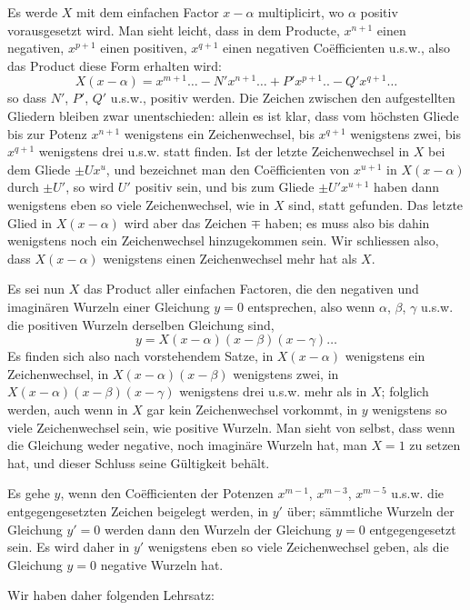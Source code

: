 \documentclass[14pt]{memoir}
\theoremstyle{plain}
\theoremstyle{remark}
\begin{document}
Es werde \(X\) mit dem einfachen Factor \(x-\alpha\) multiplicirt, wo \(\alpha\) positiv vorausgesetzt wird. Man sieht leicht, dass in dem Producte, \(x^{n+1}\) einen negativen, \(x^{p+1}\) einen positiven, \(x^{q+1}\) einen negativen Coëfficienten u.s.w., also das Product diese Form erhalten wird:
\[X(x-\alpha) = x^{m+1}\dots-N'x^{n+1}\dots+P'x^{p+1}..-Q'x^{q+1}\dots\]
so dass \(N'\), \(P'\), \(Q'\) u.s.w., positiv werden. Die Zeichen zwischen den aufgestellten Gliedern bleiben zwar unentschieden: allein es ist klar, dass vom höchsten Gliede bis zur Potenz \(x^{n+1}\) wenigstens ein Zeichenwechsel, bis \(x^{q+1}\) wenigstens zwei, bis \(x^{q+1}\) wenigstens drei u.s.w. statt finden. Ist der letzte Zeichenwechsel in \(X\) bei dem Gliede \(\pm Ux^u\), und bezeichnet man den Coëfficienten von \(x^{u+1}\) in \(X(x-\alpha)\) durch \(\pm U'\), so wird \(U'\) positiv sein, und bis zum Gliede \(\pm U'x^{u+1}\) haben dann wenigstens eben so viele Zeichenwechsel, wie in \(X\) sind, statt gefunden. Das letzte Glied in \(X(x-\alpha)\) wird aber das Zeichen \(\mp\) haben; es muss also bis dahin wenigstens noch ein Zeichenwechsel hinzugekommen sein. Wir schliessen also, dass \(X(x-\alpha)\) wenigstens einen Zeichenwechsel mehr hat als \(X\).

Es sei nun \(X\) das Product aller einfachen Factoren, die den negativen und imaginären Wurzeln einer Gleichung \(y=0\) entsprechen, also wenn \(\alpha\), \(\beta\), \(\gamma\) u.s.w. die positiven Wurzeln derselben Gleichung sind,
\[y = X(x-\alpha)(x-\beta)(x-\gamma)\dots\]
Es finden sich also nach vorstehendem Satze, in \(X(x-\alpha)\) wenigstens ein Zeichenwechsel, in \(X(x-\alpha)(x-\beta)\) wenigstens zwei, in \(X(x-\alpha)(x-\beta)(x-\gamma)\) wenigstens drei u.s.w. mehr als in \(X\); folglich werden, auch wenn in \(X\) gar kein Zeichenwechsel vorkommt, in \(y\) wenigstens so viele Zeichenwechsel sein, wie positive Wurzeln. Man sieht von selbst, dass wenn die Gleichung weder negative, noch imaginäre Wurzeln hat, man \(X=1\) zu setzen hat, und dieser Schluss seine Gültigkeit behält.

Es gehe \(y\), wenn den Coëfficienten der Potenzen \(x^{m-1}\), \(x^{m-3}\), \(x^{m-5}\) u.s.w. die entgegengesetzten Zeichen beigelegt werden, in \(y'\) über; sämmtliche Wurzeln der Gleichung \(y'=0\) werden dann den Wurzeln der Gleichung \(y = 0\) entgegengesetzt sein.  Es wird daher in \(y'\) wenigstens eben so viele Zeichenwechsel geben, als die Gleichung \(y = 0\)  negative Wurzeln hat.%

Wir haben daher folgenden Lehrsatz:
\end{document}
